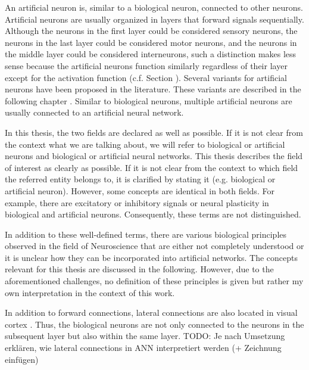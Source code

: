 An artificial neuron is, similar to a biological neuron, connected to other neurons.
Artificial neurons are usually organized in layers that forward signals sequentially.
Although the neurons in the first layer could be considered sensory neurons, the neurons in the last layer could be considered motor neurons, and the neurons in the middle layer could be considered interneurons, such a distinction makes less sense because the artificial neurons function similarly regardless of their layer except for the activation function (c.f. Section ).
Several variants for artificial neurons have been proposed in the literature. These variants are described in the following chapter .
Similar to biological neurons, multiple artificial neurons are usually connected to an artificial neural network.

In this thesis, the two fields are declared as well as possible.
If it is not clear from the context what we are talking about, we will refer to biological or artificial neurons and biological or artificial neural networks.
This thesis describes the field of interest as clearly as possible.
If it is not clear from the context to which field the referred entity belongs to, it is clarified by stating it (e.g. biological or artificial neuron).
However, some concepts are identical in both fields.
For example, there are excitatory or inhibitory signals or neural plasticity in biological and artificial neurons.
Consequently, these terms are not distinguished.

In addition to these well-defined terms, there are various biological principles observed in the field of Neuroscience that are either not completely understood or it is unclear how they can be incorporated into artificial networks.
The concepts relevant for this thesis are discussed in the following.
However, due to the aforementioned challenges, no definition of these principles is given but rather my own interpretation in the context of this work.

In addition to forward connections, lateral connections are also located in visual cortex .
Thus, the biological neurons are not only connected to the neurons in the subsequent layer but also within the same layer.
TODO: Je nach Umsetzung erklären, wie lateral connections in ANN interpretiert werden (+ Zeichnung einfügen)

